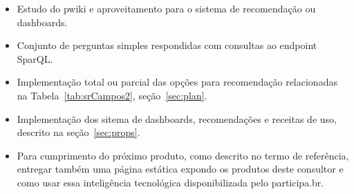 \documentclass[12pt]{article}
\begin{document}
\begin{itemize}
    \item Estudo do pwiki e aproveitamento para o sistema de recomendação ou dashboards.
    \item Conjunto de perguntas simples respondidas com consultas ao endpoint SparQL.
    \item Implementação total ou parcial das opções para recomendação relacionadas na Tabela~\ref{tab:srCampos2}, seção~\ref{sec:plan}.
    \item Implementação dos sitema de dashboards, recomendações e receitas de uso, descrito na seção~\ref{sec:props}.
    \item Para cumprimento do próximo produto, como descrito no termo de referência, entregar também uma página estática expondo os produtos deste consultor e como usar essa inteligência tecnológica disponibilizada pelo participa.br.
\end{itemize}
\end{document}
